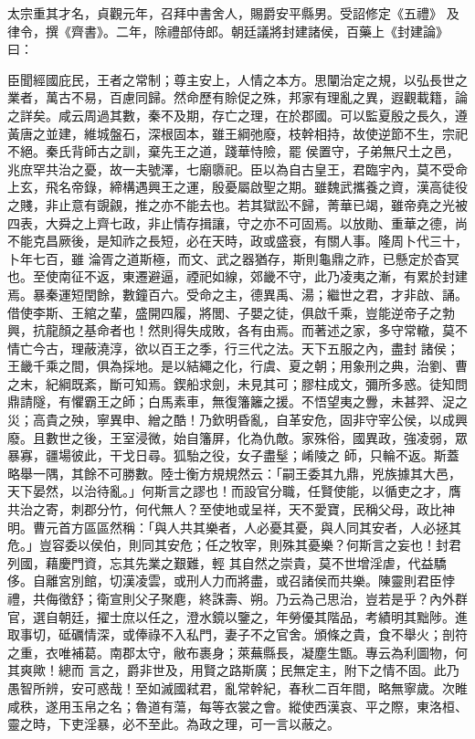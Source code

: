 \begin{pinyinscope}
 太宗重其才名，貞觀元年，召拜中書舍人，賜爵安平縣男。受詔修定《五禮》
 及律令，撰《齊書》。二年，除禮部侍郎。朝廷議將封建諸侯，百藥上《封建論》曰：



 臣聞經國庇民，王者之常制；尊主安上，人情之本方。思闡治定之規，以弘長世之業者，萬古不易，百慮同歸。然命歷有賒促之殊，邦家有理亂之異，遐觀載籍，論之詳矣。咸云周過其數，秦不及期，存亡之理，在於郡國。可以監夏殷之長久，遵黃唐之並建，維城盤石，深根固本，雖王綱弛廢，枝幹相持，故使逆節不生，宗祀不絕。秦氏背師古之訓，棄先王之道，踐華恃險，罷
 侯置守，子弟無尺土之邑，兆庶罕共治之憂，故一夫號澤，七廟隳祀。臣以為自古皇王，君臨宇內，莫不受命上玄，飛名帝錄，締構遇興王之運，殷憂屬啟聖之期。雖魏武攜養之資，漢高徒役之賤，非止意有覬覦，推之亦不能去也。若其獄訟不歸，菁華已竭，雖帝堯之光被四表，大舜之上齊七政，非止情存揖讓，守之亦不可固焉。以放勛、重華之德，尚不能克昌厥後，是知祚之長短，必在天時，政或盛衰，有關人事。隆周卜代三十，卜年七百，雖
 淪胥之道斯極，而文、武之器猶存，斯則龜鼎之祚，已懸定於杳冥也。至使南征不返，東遷避逼，禋祀如線，郊畿不守，此乃凌夷之漸，有累於封建焉。暴秦運短閏餘，數鐘百六。受命之主，德異禹、湯；繼世之君，才非啟、誦。借使李斯、王綰之輩，盛開四履，將閭、子嬰之徒，俱啟千乘，豈能逆帝子之勃興，抗龍顏之基命者也！然則得失成敗，各有由焉。而著述之家，多守常轍，莫不情亡今古，理蔽澆淳，欲以百王之季，行三代之法。天下五服之內，盡封
 諸侯；王畿千乘之間，俱為採地。是以結繩之化，行虞、夏之朝；用象刑之典，治劉、曹之末，紀綱既紊，斷可知焉。鍥船求劍，未見其可；膠柱成文，彌所多惑。徒知問鼎請隧，有懼霸王之師；白馬素車，無復籓籬之援。不悟望夷之釁，未甚羿、浞之災；高貴之殃，寧異申、繒之酷！乃欽明昏亂，自革安危，固非守宰公侯，以成興廢。且數世之後，王室浸微，始自籓屏，化為仇敵。家殊俗，國異政，強凌弱，眾暴寡，疆場彼此，干戈日尋。狐駘之役，女子盡髽；崤陵之
 師，只輪不返。斯蓋略舉一隅，其餘不可勝數。陸士衡方規規然云：「嗣王委其九鼎，兇族據其大邑，天下晏然，以治待亂。」何斯言之謬也！而設官分職，任賢使能，以循吏之才，膺共治之寄，刺郡分竹，何代無人？至使地或呈祥，天不愛寶，民稱父母，政比神明。曹元首方區區然稱：「與人共其樂者，人必憂其憂，與人同其安者，人必拯其危。」豈容委以侯伯，則同其安危；任之牧宰，則殊其憂樂？何斯言之妄也！封君列國，藉慶門資，忘其先業之艱難，輕
 其自然之崇貴，莫不世增淫虐，代益驕侈。自離宮別館，切漢凌雲，或刑人力而將盡，或召諸侯而共樂。陳靈則君臣悖禮，共侮徵舒；衛宣則父子聚麀，終誅壽、朔。乃云為己思治，豈若是乎？內外群官，選自朝廷，擢士庶以任之，澄水鏡以鑒之，年勞優其階品，考績明其黜陟。進取事切，砥礪情深，或俸祿不入私門，妻子不之官舍。頒條之貴，食不舉火；剖符之重，衣唯補葛。南郡太守，敝布裹身；萊蕪縣長，凝塵生甑。專云為利圖物，何其爽歟！總而
 言之，爵非世及，用賢之路斯廣；民無定主，附下之情不固。此乃愚智所辨，安可惑哉！至如滅國弒君，亂常幹紀，春秋二百年間，略無寧歲。次睢咸秩，遂用玉帛之名；魯道有蕩，每等衣裳之會。縱使西漢哀、平之際，東洛桓、靈之時，下吏淫暴，必不至此。為政之理，可一言以蔽之。




\end{pinyinscope}
